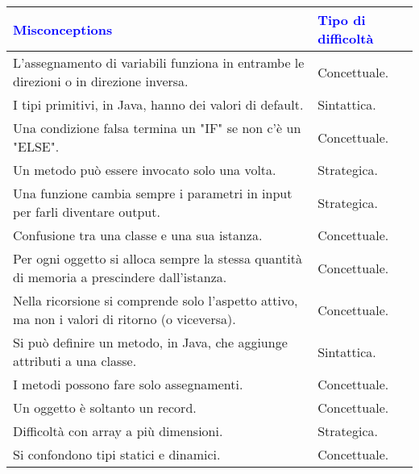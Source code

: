 \begin{center}
    \begin{tabular}{ || p{11cm} | p{5cm} ||}
    \hline\hline

    \textbf{\textcolor{blue}{Misconceptions}} & \textbf{\textcolor{blue}{Tipo di difficoltà}} \\ \hline
        
        L'assegnamento di variabili funziona in entrambe le direzioni o in direzione inversa. & Concettuale. \\\hline
        
        I tipi primitivi, in Java, hanno dei valori di default. & Sintattica. \\\hline
    
        Una condizione falsa termina un "IF" se non c'è un "ELSE". & Concettuale. \\\hline
    
        Un metodo può essere invocato solo una volta. & Strategica. \\\hline

        Una funzione cambia sempre i parametri in input per farli diventare output. & Strategica. \\\hline

        Confusione tra una classe e una sua istanza. & Concettuale. \\\hline

        Per ogni oggetto si alloca sempre la stessa quantità di memoria a prescindere dall'istanza. & Concettuale. \\\hline

        Nella ricorsione si comprende solo l'aspetto attivo, ma non i valori di ritorno
        (o viceversa). & Concettuale. \\\hline

        Si può definire un metodo, in Java, che aggiunge attributi a una classe. & Sintattica. \\\hline

        I metodi possono fare solo assegnamenti. & Concettuale. \\\hline

        Un oggetto è soltanto un record. & Concettuale. \\\hline

        Difficoltà con array a più dimensioni. & Strategica. \\\hline

        Si confondono tipi statici e dinamici. & Concettuale. \\\hline


\end{tabular}
\end{center}
